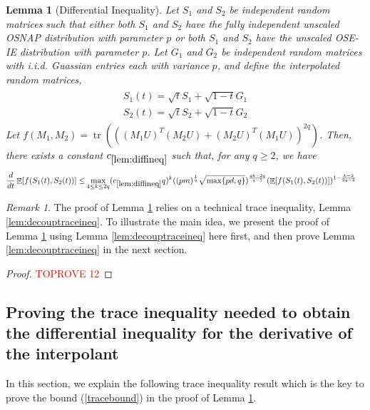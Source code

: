 \documentclass[11pt]{amsart}
\numberwithin{equation}{section}
\numberwithin{equation}{section}
\DeclareMathOperator{\E}{\mathbb{E}}
\DeclareMathOperator*{\tr}{tr}
\newtheorem{lemma}[theorem]{Lemma}
\theoremstyle{remark}
\newtheorem{remark}[theorem]{Remark}
\theoremstyle{definition}
\begin{document}
\begin{lemma}[Differential Inequality]\label{lem:diffineq}
 Let $S_1$ and $S_2$ be independent random matrices such that either both $S_1$ and $S_2$ have the fully independent unscaled OSNAP distribution with parameter $p$ or both $S_1$ and $S_2$ have the unscaled OSE-IE distribution with parameter $p$. Let $G_1$ and $G_2$ be independent random matrices with i.i.d. Guassian entries each with variance $p$, and define the interpolated random matrices,
\begin{align}
\begin{split} 
    S_1(t) = \sqrt{t}S_1 + \sqrt{1-t}G_1 \\
    S_2(t) = \sqrt{t}S_2 + \sqrt{1-t}G_2
\end{split}
\end{align}
Let $f(M_1,M_2)=\tr(((M_1U)^T(M_2U)+(M_2U)^T(M_1U))^{2q})$.
Then, there exists a constant $c_{\ref*{lem:diffineq}}$ such that, for any $q \ge 2$, we have
\begin{align*}
\frac{d}{dt} \E[f(S_1(t),S_2(t))] \le& \max \limits_{4 \le k \le 2q} (c_{\ref*{lem:diffineq}}q)^k ((pm)^{\frac{1}{q}}\sqrt{\max\{pd,q\}})^{\frac{qk-2q}{q-1}}(\E[f(S_1(t),S_2(t))])^{1-\frac{k-2}{2q-2}}
\end{align*}
\end{lemma}
\begin{remark}
The proof of Lemma \ref{lem:diffineq} relies on a technical trace inequality, Lemma \ref{lem:decouptraceineq}. To illustrate the main idea, we present the proof of Lemma \ref{lem:diffineq} using Lemma \ref{lem:decouptraceineq} here first, and then prove Lemma \ref{lem:decouptraceineq} in the next section.
\end{remark}
\begin{proof}\textcolor{red}{TOPROVE 12}\end{proof}

\subsection{Proving the trace inequality needed to obtain the differential inequality for the derivative of the interpolant} \label{subsec:osnaptraceineq}

In this section, we explain the following trace inequality result which is the key to prove the bound (\ref{tracebound}) in the proof of Lemma \ref{lem:diffineq}.
\end{document}
